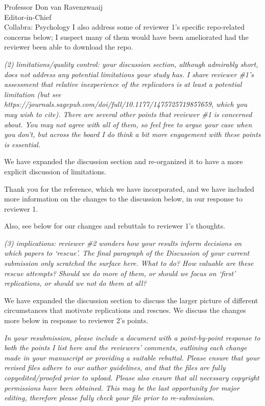 \documentclass{stanfordletter}
\newcommand{\theysaid}[1]{\begin{leftbar} \noindent 
		\textsl{ #1}\end{leftbar}}
\begin{document}
\begin{letter}{Professor Don van Ravenzwaaij \\ Editor-in-Chief \\ Collabra: Psychology }
		I also address some of reviewer 1's specific repo-related concerns below; I suspect many of them would have been ameliorated had the reviewer been able to download the repo. 
		
		\theysaid{(2) limitations/quality control: your discussion section, although admirably short, does not address any potential limitations your study has. I share reviewer \#1’s assessment that relative inexperience of the replicators is at least a potential limitation (but see https://journals.sagepub.com/doi/full/10.1177/1475725719857659, which you may wish to cite). There are several other points that reviewer \#1 is concerned about. You may not agree with all of them, so feel free to argue your case when you don’t, but across the board I do think a bit more engagement with these points is essential.}
		
		
		We have expanded the discussion section and re-organized it to have a more explicit discussion of limitations. 
		
		Thank you for the reference, which we have incorporated, and we have included more information on the changes to the discussion below, in our response to reviewer 1. 
		
		Also, see below for our changes and rebuttals to reviewer 1's thoughts.
		
		\theysaid{(3) implications: reviewer \#2 wonders how your results inform decisions on which papers to ‘rescue’. The final paragraph of the Discussion of your current submission only scratched the surface here. What to do? How valuable are these rescue attempts? Should we do more of them, or should we focus on ‘first’ replications, or should we not do them at all?}
		
		We have expanded the discussion section to discuss the larger picture of different circumstances that motivate replications and rescues. We discuss the changes more below in response to reviewer 2's points. 
		
		\theysaid{In your resubmission, please include a document with a point-by-point response to both the points I list here and the reviewers’ comments, outlining each change made in your manuscript or providing a suitable rebuttal. Please ensure that your revised files adhere to our author guidelines, and that the files are fully copyedited/proofed prior to upload. Please also ensure that all necessary copyright permissions have been obtained. This may be the last opportunity for major editing, therefore please fully check your file prior to re-submission.}
		

\end{letter}
\end{document}
